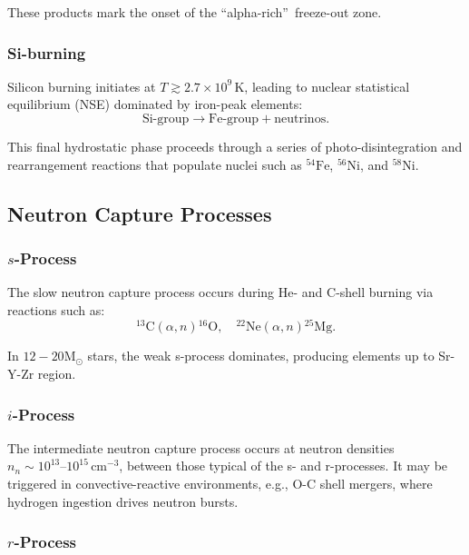 These products mark the onset of the \textquotedblleft alpha-rich\textquotedblright\ freeze-out zone.

\subsubsection{Si-burning}

Silicon burning initiates at \( T \gtrsim 2.7\times10^9\,\mathrm{K} \), leading to nuclear statistical equilibrium (NSE) dominated by iron-peak elements:
\begin{equation}
\text{Si-group} \rightarrow \text{Fe-group} + \text{neutrinos}.
\end{equation}

This final hydrostatic phase proceeds through a series of photo-disintegration and rearrangement reactions that populate nuclei such as $^{54}\mathrm{Fe}$, $^{56}\mathrm{Ni}$, and $^{58}\mathrm{Ni}$.

\subsection{Neutron Capture Processes}

\subsubsection{\texorpdfstring{$s$-Process}{s-Process}}

The slow neutron capture process occurs during He- and C-shell burning via reactions such as:
\begin{equation}
{}^{13}\mathrm{C}(\alpha,n){}^{16}\mathrm{O}, \quad {}^{22}\mathrm{Ne}(\alpha,n){}^{25}\mathrm{Mg}.
\end{equation}

In $12-20 \mathrm{M}_\odot$ stars, the weak s-process dominates, producing elements up to Sr-Y-Zr region.

\subsubsection{\texorpdfstring{$i$-Process}{i-Process}}

The intermediate neutron capture process occurs at neutron densities $n_n \sim 10^{13}\text{–}10^{15}\,\mathrm{cm}^{-3}$, between those typical of the s- and r-processes. It may be triggered in convective-reactive environments, e.g., O-C shell mergers, where hydrogen ingestion drives neutron bursts.

\subsubsection{\texorpdfstring{$r$-Process}{r-Process}}

